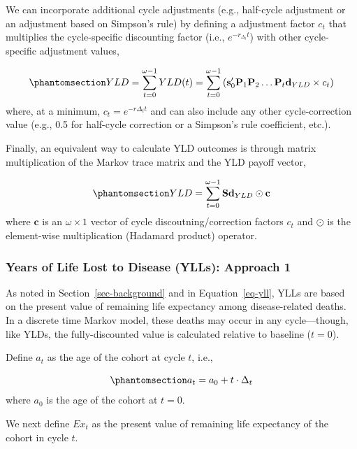 \documentclass[
]{agujournal2019}
\begin{document}
We can incorporate additional cycle adjustments (e.g., half-cycle
adjustment or an adjustment based on Simpson's rule) by defining a
adjustment factor \(c_t\) that multiplies the cycle-specific discounting
factor (i.e., \(e^{-r_{\Delta_t} t}\)) with other cycle-specific
adjustment values,

\begin{equation}\phantomsection\label{eq-yldcum2}{
YLD=\sum_{t=0}^{\omega-1} YLD(t)=\sum_{t=0}^{\omega-1}\left(\mathbf{s}'_0 \mathbf{P}_1\mathbf{P}_2\dots\mathbf{P}_t \mathbf{d}_{YLD}  \times c_t \right)
}\end{equation} where, at a minimum, \(c_t=e^{-r\Delta_t t}\) and can
also include any other cycle-correction value (e.g., 0.5 for half-cycle
correction or a Simpson's rule coefficient, etc.).

Finally, an equivalent way to calculate YLD outcomes is through matrix
multiplication of the Markov trace matrix and the YLD payoff vector,

\begin{equation}\phantomsection\label{eq-yldtrace}{
YLD = \sum_{t=0}^{\omega-1} \mathbf{S}\mathbf{d}_{YLD} \odot \mathbf{c}
}\end{equation} where \(\mathbf{c}\) is an \(\omega \times 1\) vector of
cycle discoutning/correction factors \(c_t\) and \(\odot\) is the
element-wise multiplication (Hadamard product) operator.

\subsubsection{Years of Life Lost to Disease (YLLs): Approach
1}\label{years-of-life-lost-to-disease-ylls-approach-1}

As noted in Section~\ref{sec-background} and in Equation~\ref{eq-yll},
YLLs are based on the present value of remaining life expectancy among
disease-related deaths. In a discrete time Markov model, these deaths
may occur in any cycle---though, like YLDs, the fully-discounted value
is calculated relative to baseline (\(t=0\)).

Define \(a_{t}\) as the age of the cohort at cycle \(t\), i.e.,

\begin{equation}\phantomsection\label{eq-aget}{
a_t = a_0 +t \cdot \Delta_t 
}\end{equation} where \(a_0\) is the age of the cohort at \(t=0\).

We next define \(Ex_t\) as the present value of remaining life
expectancy of the cohort in cycle \(t\).
\end{document}
